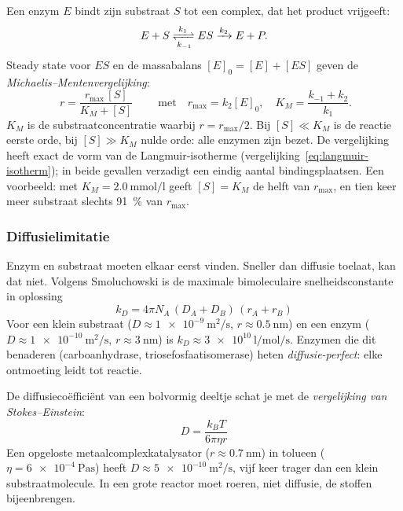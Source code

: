 Een enzym $E$ bindt zijn substraat $S$ tot een complex, dat het product vrijgeeft:
\begin{equation}
E + S \xrightleftharpoons[k_{-1}]{k_1} ES \xrightarrow{k_2} E + P.
\end{equation}
Steady state voor $ES$ en de massabalans $[E]_0 = [E] + [ES]$ geven de \emph{Michaelis--Mentenvergelijking}:
\begin{equation}
\boxed{\;r = \frac{r_{\max}\,[S]}{K_M + [S]}\;}
\qquad\text{met}\quad r_{\max} = k_2[E]_0, \quad K_M = \frac{k_{-1} + k_2}{k_1}.
\end{equation}
$K_M$ is de substraatconcentratie waarbij $r = r_{\max}/2$. Bij $[S] \ll K_M$ is de reactie eerste orde, bij $[S] \gg K_M$ nulde orde: alle enzymen zijn bezet. De vergelijking heeft exact de vorm van de Langmuir-isotherme (vergelijking~\eqref{eq:langmuir-isotherm}); in beide gevallen verzadigt een eindig aantal bindingsplaatsen. Een voorbeeld: met $K_M = \SI{2.0}{\milli\mole\per\litre}$ geeft $[S] = K_M$ de helft van $r_{\max}$, en tien keer meer substraat slechts \SI{91}{\percent} van $r_{\max}$.

\subsubsection{Diffusielimitatie}
\label{sec:diffusielimitatie}

Enzym en substraat moeten elkaar eerst vinden. Sneller dan diffusie toelaat, kan dat niet. Volgens Smoluchowski is de maximale bimoleculaire snelheidsconstante in oplossing
\begin{equation}
\boxed{\;k_D = 4\pi N_A\,(D_A+D_B)\,(r_A+r_B)\;}
\label{eq:smoluchowski}
\end{equation}
Voor een klein substraat ($D \approx \SI{1e-9}{\metre\squared\per\second}$, $r \approx \SI{0.5}{\nano\metre}$) en een enzym ($D \approx \SI{1e-10}{\metre\squared\per\second}$, $r \approx \SI{3}{\nano\metre}$) is $k_D \approx \SI{3e10}{\litre\per\mole\per\second}$. Enzymen die dit benaderen (carboanhydrase, triosefosfaatisomerase) heten \emph{diffusie-perfect}: elke ontmoeting leidt tot reactie.

De diffusieco\"effici\"ent van een bolvormig deeltje schat je met de \emph{vergelijking van Stokes--Einstein}:
\begin{equation}
\boxed{\;D = \frac{k_BT}{6\pi\eta r}\;}
\label{eq:stokes-einstein}
\end{equation}
Een opgeloste metaalcomplexkatalysator ($r \approx \SI{0.7}{\nano\metre}$) in tolueen ($\eta = \SI{6e-4}{\pascal\second}$) heeft $D \approx \SI{5e-10}{\metre\squared\per\second}$, vijf keer trager dan een klein substraatmolecule. In een grote reactor moet roeren, niet diffusie, de stoffen bijeenbrengen.

